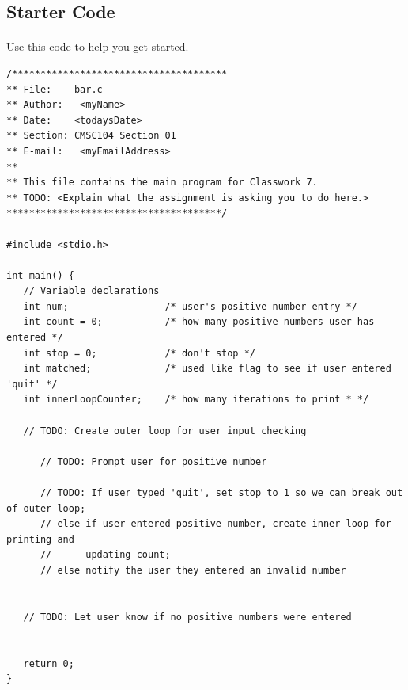 \documentclass[letter,11pt]{article}
\begin{document}
\subsection*{Starter Code}
\paragraph{}Use this code to help you get started.
\begin{verbatim}
/**************************************
** File:    bar.c
** Author:   <myName>
** Date:    <todaysDate>
** Section: CMSC104 Section 01
** E-mail:   <myEmailAddress>
**
** This file contains the main program for Classwork 7.
** TODO: <Explain what the assignment is asking you to do here.>
**************************************/

#include <stdio.h>

int main() {
   // Variable declarations
   int num;                 /* user's positive number entry */
   int count = 0;           /* how many positive numbers user has entered */
   int stop = 0;            /* don't stop */
   int matched;             /* used like flag to see if user entered 'quit' */
   int innerLoopCounter;    /* how many iterations to print * */

   // TODO: Create outer loop for user input checking

      // TODO: Prompt user for positive number

      // TODO: If user typed 'quit', set stop to 1 so we can break out of outer loop;
      // else if user entered positive number, create inner loop for printing and 
      //      updating count;
      // else notify the user they entered an invalid number


   // TODO: Let user know if no positive numbers were entered


   return 0;
}
\end{verbatim}
\end{document}
